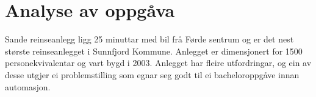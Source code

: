 \chapter{Analyse av oppgåva}
\thispagestyle{fancy}
Sande reinseanlegg ligg 25 minuttar med bil frå Førde sentrum og er det 
nest største reinseanlegget i \gls{Sunnfjord Kommune}. Anlegget er dimensjonert for 1500 personekvivalentar
og vart bygd i 2003. Anlegget har fleire utfordringar, og ein av desse utgjer ei problemstilling som egnar seg godt til ei
bacheloroppgåve innan automasjon.